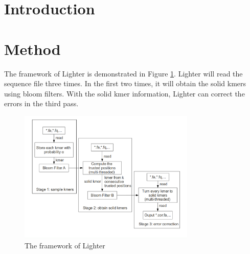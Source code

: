 \documentclass[10pt]{article}
\begin{document}

\section*{Introduction}
\section*{Method}
The framework of Lighter is demonstrated in Figure \ref{fig:lighter_framework}. Lighter will read the sequence file three times. In the first two times, it will obtain the solid kmers using bloom filters. With the solid kmer information, Lighter can correct the errors in the third pass.

\begin{figure}[h!]
\begin{center}
\includegraphics[width=0.75\textwidth]{lighter_framework.png}
\caption{The framework of Lighter\label{fig:lighter_framework}}
\end{center}
\end{figure}
\end{document}
